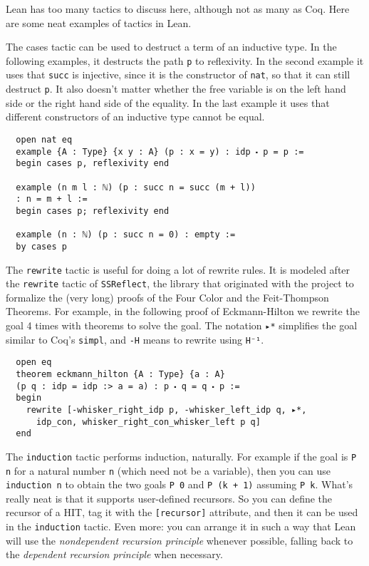 \documentclass[11pt]{amsart}  %
\begin{document}
\begin{enumerate}
Lean has too many tactics to discuss here, although not as many as Coq.
Here are some neat examples of tactics in Lean.

The cases tactic can be used to destruct a term of an inductive type. In the following examples,
it destructs the path \lstinline{p} to reflexivity. In the second example it uses that \lstinline{succ} is
injective, since it is the constructor of \lstinline{nat}, so that it can still destruct \lstinline{p}.
It also doesn't matter whether the free variable is on the left hand side or the right hand
side of the equality. In the last example it uses that different constructors of an inductive type cannot be equal.

\begin{lstlisting}
  open nat eq
  example {A : Type} {x y : A} (p : x = y) : idp ⬝ p = p :=
  begin cases p, reflexivity end
  
  example (n m l : ℕ) (p : succ n = succ (m + l))
  : n = m + l :=
  begin cases p; reflexivity end
  
  example (n : ℕ) (p : succ n = 0) : empty :=
  by cases p
\end{lstlisting}

The \lstinline{rewrite} tactic is useful for doing a lot of rewrite rules.
It is modeled after the \lstinline{rewrite} tactic of {\tt SSReflect}, the library that originated with the project to formalize the (very long) proofs of the Four Color and the Feit-Thompson
Theorems. For example, in the following proof of Eckmann-Hilton we rewrite the goal 4
times with theorems to solve the goal. The notation \lstinline{▸*} simplifies the goal
similar to Coq's \lstinline{simpl}, and \lstinline{-H} means to rewrite using \lstinline{H⁻¹}.

\begin{lstlisting}
  open eq
  theorem eckmann_hilton {A : Type} {a : A}
  (p q : idp = idp :> a = a) : p ⬝ q = q ⬝ p :=
  begin
    rewrite [-whisker_right_idp p, -whisker_left_idp q, ▸*,
      idp_con, whisker_right_con_whisker_left p q]
  end
\end{lstlisting}

The \lstinline{induction} tactic performs induction, naturally. For example if the goal is \lstinline{P n} for
a natural number \lstinline{n} (which need not be a variable), then you can use \lstinline{induction n} to
obtain the two goals \lstinline{P 0} and \lstinline{P (k + 1)} assuming \lstinline{P k}. What's really neat is
that it supports user-defined recursors. So you can define the recursor of a HIT, tag it
with the \lstinline{[recursor]} attribute, and then it can be used in the \lstinline{induction} tactic.
Even more: you can arrange it in such a way that Lean will use the \emph{nondependent recursion principle}
whenever possible, falling back to the \emph{dependent recursion principle} when necessary.


\end{enumerate}
\end{document}
